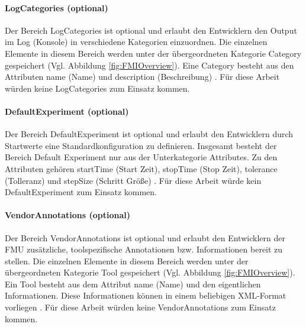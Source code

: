 \paragraph{LogCategories (optional)}\label{sec:LogCategories}
\noindent Der Bereich LogCategories ist optional und erlaubt den Entwicklern den Output im Log (Konsole) in verschiedene Kategorien einzuordnen. Die einzelnen Elemente in diesem Bereich werden unter der übergeordneten Kategorie Category gespeichert (Vgl. Abbildung \ref{fig:FMIOverview}). Eine Category besteht aus den Attributen name (Name) und description (Beschreibung) \cite[S.43]{25}.
\newline
Für diese Arbeit würden keine LogCategories zum Einsatz kommen.
\paragraph{DefaultExperiment (optional)}\label{sec:DefaultExperiment}
\noindent Der Bereich DefaultExperiment ist optional und erlaubt den Entwicklern durch Startwerte eine Standardkonfiguration zu definieren. Insgesamt besteht der Bereich Default Experiment nur aus der Unterkategorie Attributes. Zu den Attributen gehören startTime (Start Zeit), stopTime (Stop Zeit), tolerance (Tolleranz) und stepSize (Schritt Größe) \cite[S.44]{25}.
\newline
Für diese Arbeit würde kein DefaultExperiment zum Einsatz kommen.
\paragraph{VendorAnnotations (optional)}\label{sec:VendorAnnotations}
\noindent Der Bereich VendorAnnotations ist optional und erlaubt den Entwicklern der FMU zusätzliche, toolspezifische Annotationen bzw. Informationen bereit zu stellen. Die einzelnen Elemente in diesem Bereich werden unter der übergeordneten Kategorie Tool gespeichert (Vgl. Abbildung \ref{fig:FMIOverview}). Ein Tool besteht aus dem Attribut name (Name) und den eigentlichen Informationen. Diese Informationen können in einem beliebigen XML-Format vorliegen \cite[S.45]{25}.
\newline
Für diese Arbeit würden keine VendorAnnotations zum Einsatz kommen.

